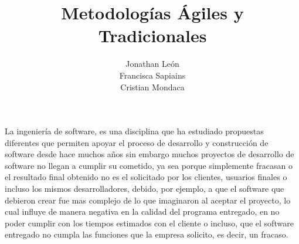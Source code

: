 \documentclass[10pt,a4paper]{article}
\begin{document}
\title{Metodolog\' ias \' Agiles y Tradicionales}
\author{Jonathan Le\'on \\Francisca Sapiains\\Cristian Mondaca}
\maketitle

La ingenier\' ia de software, es una disciplina que ha estudiado propuestas diferentes
 que permiten apoyar el proceso de desarrollo y construcci\' on de software 
 desde hace muchos a\~nos sin embargo muchos proyectos de desarrollo de
  software no llegan a cumplir su cometido,
  ya sea porque simplemente fracasan o el resultado final obtenido no es el
   solicitado por los clientes, usuarios finales o incluso los mismos 
   desarrolladores, debido, por ejemplo, a que el
   software que debieron crear fue mas complejo de lo que imaginaron al aceptar el proyecto,
    lo cual influye de manera negativa en la calidad del programa entregado, en no poder 
    cumplir con los tiempos estimados con el cliente o incluso, que el software 
    entregado no cumpla las funciones que la empresa solicito, es decir, un fracaso. \\
\end{document}
